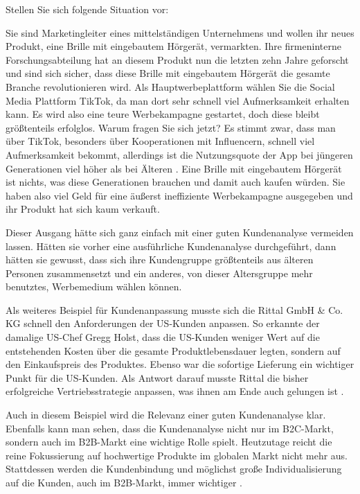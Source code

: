 \begin{refsection}
  
  
  Stellen Sie sich folgende Situation vor:

  Sie sind Marketingleiter eines mittelständigen Unternehmens und wollen ihr neues Produkt, eine Brille mit eingebautem Hörgerät, vermarkten. Ihre firmeninterne Forschungsabteilung hat an diesem Produkt nun die letzten zehn Jahre geforscht und sind sich sicher, dass diese Brille mit eingebautem Hörgerät die gesamte Branche revolutionieren wird. Als Hauptwerbeplattform wählen Sie die Social Media Plattform TikTok, da man dort sehr schnell viel Aufmerksamkeit erhalten kann. Es wird also eine teure Werbekampagne gestartet, doch diese bleibt größtenteils erfolglos. Warum fragen Sie sich jetzt? Es stimmt zwar, dass man über TikTok, besonders über Kooperationen mit Influencern, schnell viel Aufmerksamkeit bekommt, allerdings ist die Nutzungsquote der App bei jüngeren Generationen viel höher als bei Älteren \autocite{Statista1, Statista2}. Eine Brille mit eingebautem Hörgerät ist nichts, was diese Generationen brauchen und damit auch kaufen würden. Sie haben also viel Geld für eine äußerst ineffiziente Werbekampagne ausgegeben und ihr Produkt hat sich kaum verkauft.

  Dieser Ausgang hätte sich ganz einfach mit einer guten Kundenanalyse vermeiden lassen. Hätten sie vorher eine ausführliche Kundenanalyse durchgeführt, dann hätten sie gewusst, dass sich ihre Kundengruppe größtenteils aus älteren Personen zusammensetzt und ein anderes, von dieser Altersgruppe mehr benutztes, Werbemedium wählen können.

  Als weiteres Beispiel für Kundenanpassung musste sich die Rittal GmbH \& Co. KG schnell den Anforderungen der US-Kunden anpassen. So erkannte der damalige US-Chef Gregg Holst, dass die US-Kunden weniger Wert auf die entstehenden Kosten über die gesamte Produktlebensdauer legten, sondern auf den Einkaufspreis des Produktes. Ebenso war die sofortige Lieferung ein wichtiger Punkt für die US-Kunden. Als Antwort darauf musste Rittal die bisher erfolgreiche Vertriebsstrategie anpassen, was ihnen am Ende auch gelungen ist \autocite[66]{Scheed2021}. 

  Auch in diesem Beispiel wird die Relevanz einer guten Kundenanalyse klar. Ebenfalls kann man sehen, dass die Kundenanalyse nicht nur im B2C-Markt, sondern auch im B2B-Markt eine wichtige Rolle spielt. Heutzutage reicht die reine Fokussierung auf hochwertige Produkte im globalen Markt nicht mehr aus. Stattdessen werden die Kundenbindung und möglichst große Individualisierung auf die Kunden, auch im B2B-Markt, immer wichtiger \autocite[66]{Scheed2021}. 

  \clearpage
  \printbibliography[heading=subsubbibliography]
\end{refsection}
\clearpage
